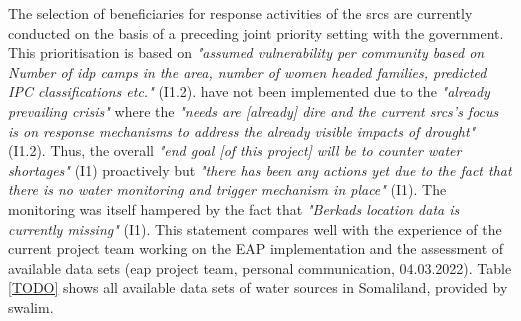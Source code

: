 The selection of beneficiaries for response activities of the \acrshort*{srcs} are currently conducted on the basis of a preceding joint priority setting with the government. This prioritisation is based on \textit{"assumed vulnerability per community based on Number of \acrfull{idp} camps in the area, number of women headed families, predicted IPC classifications etc."} (I1.2).  have not been implemented due to the \textit{"already prevailing crisis"} where the \textit{"needs are [already] dire and the current \acrshort{srcs}'s focus is on response mechanisms to address the already visible impacts of drought"} (I1.2). Thus, the overall \textit{"end goal [of this project] will be to counter water shortages"} (I1) proactively but \textit{"there has been any actions yet due to the fact that there is no water monitoring and trigger mechanism in place"} (I1). The monitoring was itself hampered by the fact that \textit{"Berkads location data is currently missing"} (I1). This statement compares well with the experience of the current project team working on the EAP implementation and the assessment of available data sets (\acrshort{eap} project team, personal communication, 04.03.2022).\newline
Table \ref*{TODO} shows all available data sets of water sources in Somaliland, provided by \acrshort*{swalim}. %


